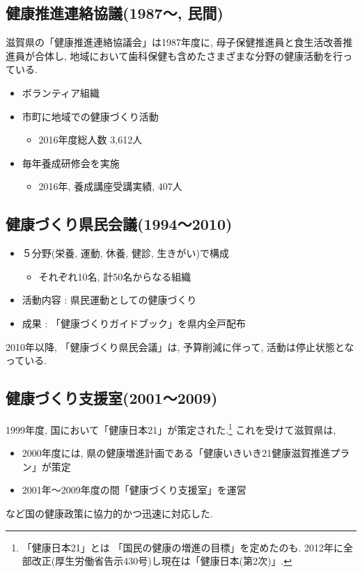 \subsection{健康推進連絡協議(1987〜, 民間)}
滋賀県の「健康推進連絡協議会」は1987年度に, 母子保健推進員と食生活改善推進員が合体し, 地域において歯科保健も含めたさまざまな分野の健康活動を行っている.
\begin{itemize} \setlength{\itemsep}{-0.5mm} \setlength{\parskip}{-0.5mm}

	\item  ボランティア組織
	\item  市町に地域での健康づくり活動
	      \begin{itemize} \setlength{\itemsep}{-0.5mm} \setlength{\parskip}{-0.5mm}
		      \item 2016年度総人数 3,612人
	      \end{itemize}
	\item  毎年養成研修会を実施
	      \begin{itemize} \setlength{\itemsep}{-0.5mm} \setlength{\parskip}{-0.5mm}
		      \item 2016年, 養成講座受講実績, 407人
	      \end{itemize}
\end{itemize}

\subsection{健康づくり県民会議(1994〜2010)}
\begin{itemize} \setlength{\itemsep}{-0.5mm} \setlength{\parskip}{-0.5mm}
	\item ５分野(栄養, 運動, 休養, 健診, 生きがい)で構成
	      \begin{itemize} \setlength{\itemsep}{-0.5mm} \setlength{\parskip}{-0.5mm}
		      \item それぞれ10名, 計50名からなる組織
	      \end{itemize}
	\item 活動内容 : 県民運動としての健康づくり
	\item 成果 : 「健康づくりガイドブック」を県内全戸配布
\end{itemize}
2010年以降, 「健康づくり県民会議」は, 予算削減に伴って, 活動は停止状態となっている.

\subsection{健康づくり支援室(2001〜2009)}
1999年度, 国において「健康日本21」が策定された.\footnote{「健康日本21」とは
	「国民の健康の増進の目標」を定めたのも. 2012年に全部改正(厚生労働省告示430号)し現在は「健康日本(第2次)」.}
これを受けて滋賀県は,
\begin{itemize} \setlength{\itemsep}{-0.5mm} \setlength{\parskip}{-0.5mm}
	\item 2000年度には, 県の健康増進計画である「健康いきいき21健康滋賀推進プラン」が策定
	\item 2001年〜2009年度の間「健康づくり支援室」を運営
\end{itemize}
など国の健康政策に協力的かつ迅速に対応した.

